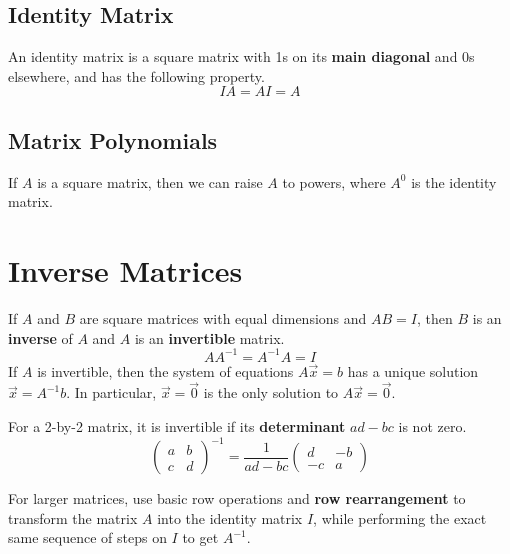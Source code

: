 \documentclass[11pt]{article}
\begin{document}
		\subsection{Identity Matrix}
			An identity matrix is a square matrix with 1s on its \textbf{main diagonal} and 0s elsewhere, and has the following property.
			\begin{equation}
				IA=AI=A
			\end{equation}
			
		\subsection{Matrix Polynomials}
			If $A$ is a square matrix, then we can raise $A$ to powers, where $A^0$ is the identity matrix.
			
\section{Inverse Matrices}
	If $A$ and $B$ are square matrices with equal dimensions and $AB = I$, then $B$ is an \textbf{inverse} of $A$ and $A$ is an \textbf{invertible} matrix.
	\begin{equation}
		AA^{-1} = A^{-1}A = I
	\end{equation}
	If $A$ is invertible, then the system of equations $A\vec{x}=b$ has a unique solution $\vec{x}=A^{-1}b$. In particular, $\vec{x}=\vec{0}$ is the only solution to $A\vec{x}=\vec{0}$.
	
	For a 2-by-2 matrix, it is invertible if its \textbf{determinant} $ad-bc$ is not zero.
	\begin{equation}
		\left(\begin{matrix}
			a&b\\c&d
		\end{matrix}\right)^{-1} = \frac{1}{ad-bc}\left(\begin{matrix}
			d&-b\\-c&a
		\end{matrix}\right)
	\end{equation}
	
	For larger matrices, use basic row operations and \textbf{row rearrangement} to transform the matrix $A$ into the identity matrix $I$, while performing the exact same sequence of steps on $I$ to get $A^{-1}$.
	
\end{document}
